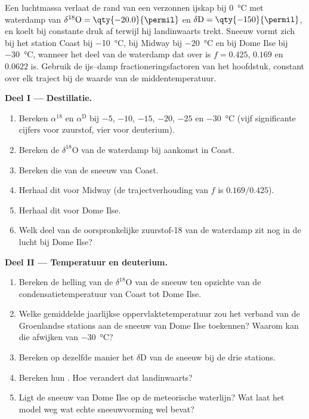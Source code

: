 \begin{problem}\label{pb:b3:stable-isotopes:1}
Een luchtmassa verlaat de rand van een verzonnen ijskap bij \qty{0}{\celsius}
met waterdamp van $\delta^{18}\mathrm O = \qty{-20.0}{\permil}$ en $\delta\mathrm D =
\qty{-150}{\permil}$, en koelt bij constante druk af terwijl hij landinwaarts trekt.
Sneeuw vormt zich bij het station Coast bij \qty{-10}{\celsius}, bij Midway bij
\qty{-20}{\celsius} en bij Dome Ilse bij \qty{-30}{\celsius}, wanneer het deel van de
waterdamp dat over is $f = 0.425$, $0.169$ en $0.0622$ is. Gebruik de ijs--damp
fractioneringsfactoren van het hoofdstuk, constant over elk traject bij de waarde van
de middentemperatuur.

\medskip\noindent\textbf{Deel I --- Destillatie.}
\begin{enumerate}
\item Bereken $\alpha^{18}$ en $\alpha^{\mathrm D}$ bij $-5$, $-10$, $-15$, $-20$,
$-25$ en \qty{-30}{\celsius} (vijf significante cijfers voor zuurstof, vier voor
deuterium).
\item Bereken de $\delta^{18}\mathrm O$ van de waterdamp bij aankomst in Coast.
\item Bereken die van de sneeuw van Coast.
\item Herhaal dit voor Midway (de trajectverhouding van $f$ is $0.169/0.425$).
\item Herhaal dit voor Dome Ilse.
\item Welk deel van de oorspronkelijke zuurstof-18 van de waterdamp zit nog in de lucht
bij Dome Ilse?
\end{enumerate}

\medskip\noindent\textbf{Deel II --- Temperatuur en deuterium.}
\begin{enumerate}[resume]
\item Bereken de helling van de $\delta^{18}\mathrm O$ van de sneeuw ten opzichte van de
condensatietemperatuur van Coast tot Dome Ilse.
\item Welke gemiddelde jaarlijkse oppervlaktetemperatuur zou het verband van de
Groenlandse stations aan de sneeuw van Dome Ilse toekennen? Waarom kan die
afwijken van \qty{-30}{\celsius}?
\item Bereken op dezelfde manier het $\delta\mathrm D$ van de sneeuw bij de drie stations.
\item Bereken hun . Hoe verandert dat landinwaarts?
\item Ligt de sneeuw van Dome Ilse op de meteorische waterlijn? Wat laat het model
weg wat echte sneeuwvorming wel bevat?
\end{enumerate}


\end{problem}

